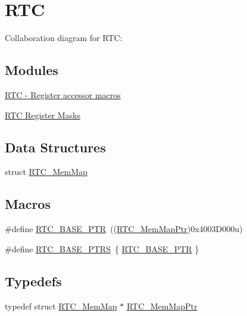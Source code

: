 \hypertarget{group___r_t_c___peripheral}{}\section{R\+TC}
\label{group___r_t_c___peripheral}
Collaboration diagram for R\+TC\+:
\subsection*{Modules}
\begin{DoxyCompactItemize}
\item 
\hyperlink{group___r_t_c___register___accessor___macros}{R\+T\+C -\/ Register accessor macros}
\item 
\hyperlink{group___r_t_c___register___masks}{R\+T\+C Register Masks}
\end{DoxyCompactItemize}
\subsection*{Data Structures}
\begin{DoxyCompactItemize}
\item 
struct \hyperlink{struct_r_t_c___mem_map}{R\+T\+C\+\_\+\+Mem\+Map}
\end{DoxyCompactItemize}
\subsection*{Macros}
\begin{DoxyCompactItemize}
\item 
\#define \hyperlink{group___r_t_c___peripheral_ga6455e2b767b4b224b4f00b50e87a2441}{R\+T\+C\+\_\+\+B\+A\+S\+E\+\_\+\+P\+TR}~((\hyperlink{group___r_t_c___peripheral_gac92da66fe1171e5751505df29917b152}{R\+T\+C\+\_\+\+Mem\+Map\+Ptr})0x4003\+D000u)
\item 
\#define \hyperlink{group___r_t_c___peripheral_ga426dff8af34f3304d58b5bed5a54e583}{R\+T\+C\+\_\+\+B\+A\+S\+E\+\_\+\+P\+T\+RS}~\{ \hyperlink{group___r_t_c___peripheral_ga6455e2b767b4b224b4f00b50e87a2441}{R\+T\+C\+\_\+\+B\+A\+S\+E\+\_\+\+P\+TR} \}
\end{DoxyCompactItemize}
\subsection*{Typedefs}
\begin{DoxyCompactItemize}
\item 
typedef struct \hyperlink{struct_r_t_c___mem_map}{R\+T\+C\+\_\+\+Mem\+Map} $\ast$ \hyperlink{group___r_t_c___peripheral_gac92da66fe1171e5751505df29917b152}{R\+T\+C\+\_\+\+Mem\+Map\+Ptr}
\end{DoxyCompactItemize}


